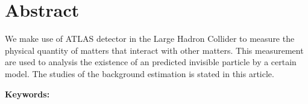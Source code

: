 \documentclass[class=NCU_thesis, crop=false]{standalone}
\begin{document}
\chapter{Abstract}
	We make use of ATLAS detector in the Large Hadron Collider to measure the physical quantity of matters that interact with other matters. This measurement are used to analysis the existence of an predicted invisible particle by a certain model. The studies of the background estimation is stated in this article.

\vspace{2em}
\noindent \textbf{Keywords:} \keywordsEn{} %
\end{document}
